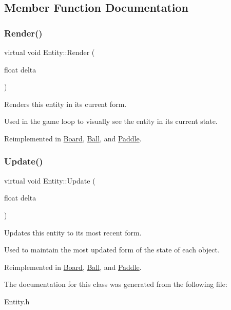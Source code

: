 \subsection{Member Function Documentation}
\mbox{\label{classEntity_a48b58f16934376de583771ddabcf5bdb}} 
\subsubsection{\texorpdfstring{Render()}{Render()}}
{\footnotesize\ttfamily virtual void Entity\+::\+Render (\begin{DoxyParamCaption}\item[{float}]{delta }\end{DoxyParamCaption})\hspace{0.3cm}{\ttfamily [virtual]}}



Renders this entity in its current form. 

Used in the game loop to visually see the entity in its current state. 

Reimplemented in \hyperlink{classBoard_a2cdb83c07225dd83366ce10ea2978dd8}{Board}, \hyperlink{classBall_a1103f2193c0e478926eb6af95a65d46e}{Ball}, and \hyperlink{classPaddle_a166255dfac354af75059ed4a72e1a0ee}{Paddle}.

\mbox{\label{classEntity_aec10420b2cfc1b9a367d018966c620d3}} 
\subsubsection{\texorpdfstring{Update()}{Update()}}
{\footnotesize\ttfamily virtual void Entity\+::\+Update (\begin{DoxyParamCaption}\item[{float}]{delta }\end{DoxyParamCaption})\hspace{0.3cm}{\ttfamily [virtual]}}



Updates this entity to its most recent form. 

Used to maintain the most updated form of the state of each object. 

Reimplemented in \hyperlink{classBoard_aa1fb89db8206ace3f973f2f911af4125}{Board}, \hyperlink{classBall_af6db0c50a2974beb4c27cb29c9a0e2df}{Ball}, and \hyperlink{classPaddle_a8a3aa86f567315423f92ecfb5fd3b6f5}{Paddle}.



The documentation for this class was generated from the following file\+:\begin{DoxyCompactItemize}
\item 
Entity.\+h\end{DoxyCompactItemize}
